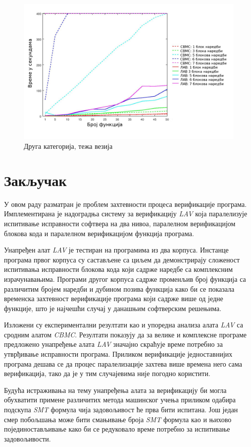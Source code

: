 \documentclass[12pt,oneside]{memoir}
\begin{document}
\begin{figure}[!ht]
  \centering
  \includegraphics[scale=0.6]{img/nivo_2Ta.jpg}
  \caption{Друга категорија, тежа везија}
  \label{fig:nivo_2t}
\end{figure}


\chapter{Закључак} 

У овом раду разматран је проблем захтевности процеса верификације програма. Имплементирана је надоградња систему за верификацију \textit{LAV} која паралелизује испитивање исправности софтвера на два нивоа, паралелном верификацијом блокова кода и паралелном верификацијом функција програма.

Унапређен алат \textit{LAV} је тестиран на програмима из два корпуса. Инстанце програма првог корпуса су састављене са циљем да демонстрирају сложеност испитивања исправности блокова кода који садрже наредбе са комплексним израчунавањима. Програми другог корпуса садрже променљив број функција са различитим бројем наредби и дубином позива функција како би се показала временска захтевност верификације програма који садрже више од једне функције, што је најчешћи случај у данашњим софтверским решењима.

Изложени су експериментални резултати као и упоредна анализа алата \textit{LAV} са сродним алатом \textit{CBMC}. Резултати показују да за велике и комплексне програме предложено унапређење алата \textit{LAV} значајно скраћује време потребно за утврђивање исправности програма. Приликом верификације једноставнијих програма дешава се да процес паралелизације захтева више времена него сама верификација, тако да је у тим случајевима није погодно користити.

Будућа истраживања на тему унапређења алата за верификацију би могла обухватити примене различитих метода машинског учења приликом одабира подскупа \textit{SMT} формула чија задовољивост ће прва бити испитана. Још један смер побољшања може бити смањивање броја \textit{SMT} формула као и њихово појединостављивање како би се редуковало време потребно за испитивање задовољивости.


\literatura
\backmatter
\end{document}

